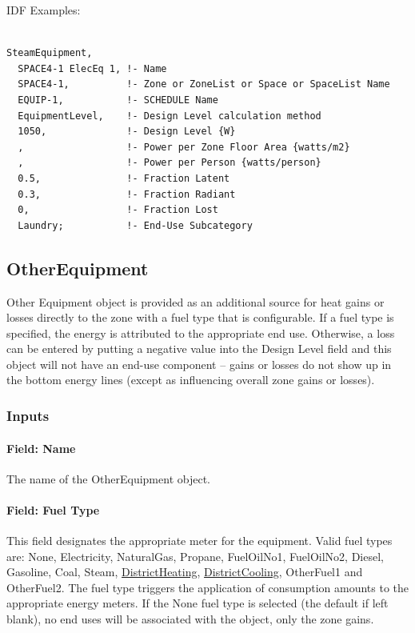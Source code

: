 IDF Examples:

\begin{lstlisting}

SteamEquipment,
  SPACE4-1 ElecEq 1, !- Name
  SPACE4-1,          !- Zone or ZoneList or Space or SpaceList Name
  EQUIP-1,           !- SCHEDULE Name
  EquipmentLevel,    !- Design Level calculation method
  1050,              !- Design Level {W}
  ,                  !- Power per Zone Floor Area {watts/m2}
  ,                  !- Power per Person {watts/person}
  0.5,               !- Fraction Latent
  0.3,               !- Fraction Radiant
  0,                 !- Fraction Lost
  Laundry;           !- End-Use Subcategory
\end{lstlisting}

\subsection{OtherEquipment}\label{otherequipment}

Other Equipment object is provided as an additional source for heat gains or losses directly to the zone with a fuel type that is configurable. If a fuel type is specified, the energy is attributed to the appropriate end use. Otherwise, a loss can be entered by putting a negative value into the Design Level field and this object will not have an end-use component -- gains or losses do not show up in the bottom energy lines (except as influencing overall zone gains or losses).

\subsubsection{Inputs}\label{inputs-8-010}

\paragraph{Field: Name}\label{field-name-8-008}

The name of the OtherEquipment object.

\paragraph{Field: Fuel Type}\label{field-fuel-use-type}

This field designates the appropriate meter for the equipment. Valid fuel types are: None, Electricity, NaturalGas, Propane, FuelOilNo1, FuelOilNo2, Diesel, Gasoline, Coal, Steam, \hyperref[districtheating]{DistrictHeating}, \hyperref[districtcooling]{DistrictCooling}, OtherFuel1 and OtherFuel2. The fuel type triggers the application of consumption amounts to the appropriate energy meters. If the None fuel type is selected (the default if left blank), no end uses will be associated with the object, only the zone gains.

